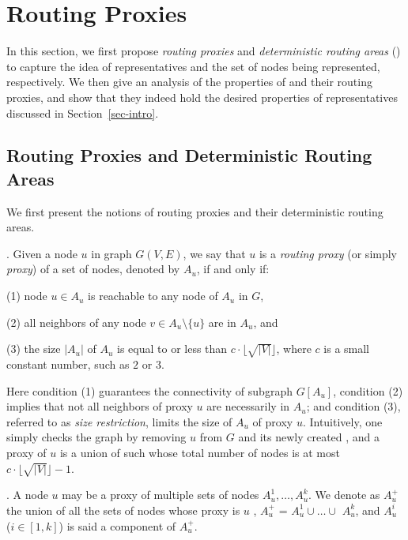 \section{Routing Proxies}
\label{sec-proxy}



In this section, we first propose {\em routing  proxies} and {\em deterministic routing areas} (\dras) to capture the idea of representatives and the set of
nodes being represented, respectively. We then give an analysis of the properties of  \dras and their routing proxies, and show that they indeed hold the desired properties of representatives discussed in Section~\ref{sec-intro}.

\subsection{Routing Proxies and Deterministic Routing Areas}
\label{subsec-proxy-def}

We first present the notions of routing proxies and their deterministic routing areas.

. Given a node $u$ in graph $G(V, E)$, we say that $u$ is a {\em routing proxy} (or simply {\em proxy}) of a set of nodes, denoted by $A_{u}$, if and only if:

\sstab(1) node $u\in A_{u}$ is reachable to any node of $A_u$ in $G$,

\sstab(2) all neighbors of any node $v\in A_u\setminus \{u\}$ are in $A_u$,  and

\sstab(3) the size $|A_u|$ of $A_u$ is equal to or less than $c\cdot\lfloor\sqrt{|V|}\rfloor$, where $c$ is a small constant number, such as $2$ or $3$.


Here condition (1) guarantees the connectivity of subgraph $G[A_u]$,  condition (2) implies that not all neighbors of proxy $u$ are necessarily in $A_u$;
and condition (3), referred to as {\em size restriction}, limits the size of $A_u$ of proxy $u$.
Intuitively, one simply checks the graph by removing $u$ from $G$ and its newly created
\ccs , and a proxy of $u$ is a union of such \ccs whose total number of nodes is at most $c\cdot\lfloor\sqrt{|V|}\rfloor - 1$.




. A node $u$ may be a proxy of multiple sets of nodes $A^1_u, \ldots, A^k_u$. 
We denote as $A^{+}_u$ the union of all the sets of nodes whose proxy is $u$ , \ie  $A^{+}_u$ = $A^1_u\cup\ldots\cup$ $A^k_u$,
and $A^i_u$ ($i\in[1,k]$) is said a component of $A^{+}_u$.

